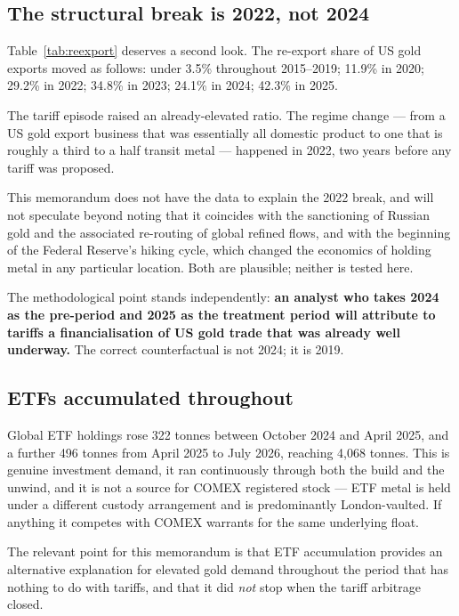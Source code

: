\documentclass[11pt,a4paper]{article}
\begin{document}
\subsection{The structural break is 2022, not 2024}

Table~\ref{tab:reexport} deserves a second look. The re-export share of US gold exports moved
as follows: under 3.5\% throughout 2015--2019; 11.9\% in 2020; 29.2\% in 2022; 34.8\% in 2023;
24.1\% in 2024; 42.3\% in 2025.

The tariff episode raised an already-elevated ratio. The regime change --- from a US gold export
business that was essentially all domestic product to one that is roughly a third to a half
transit metal --- happened in 2022, two years before any tariff was proposed.

This memorandum does not have the data to explain the 2022 break, and will not speculate beyond
noting that it coincides with the sanctioning of Russian gold and the associated re-routing of
global refined flows, and with the beginning of the Federal Reserve's hiking cycle, which
changed the economics of holding metal in any particular location. Both are plausible;
neither is tested here.

The methodological point stands independently: \textbf{an analyst who takes 2024 as the
pre-period and 2025 as the treatment period will attribute to tariffs a financialisation of US
gold trade that was already well underway.} The correct counterfactual is not 2024; it is
2019.

\subsection{ETFs accumulated throughout}

Global ETF holdings rose 322 tonnes between October 2024 and April 2025, and a further 496
tonnes from April 2025 to July 2026, reaching 4{,}068 tonnes. This is genuine investment
demand, it ran continuously through both the build and the unwind, and it is not a source for
COMEX registered stock --- ETF metal is held under a different custody arrangement and is
predominantly London-vaulted. If anything it competes with COMEX warrants for the same
underlying float.

The relevant point for this memorandum is that ETF accumulation provides an alternative
explanation for elevated gold demand throughout the period that has nothing to do with tariffs,
and that it did \emph{not} stop when the tariff arbitrage closed.
\end{document}
